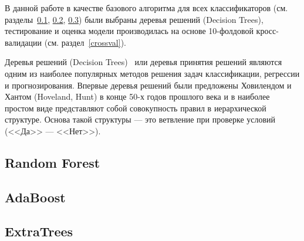 В данной работе в качестве базового алгоритма для всех классификаторов (см. разделы~\ref{random_forest},
\ref{ada}, \ref{extra}) были выбраны деревья решений 
(Decision Trees), тестирование и оценка модели производилась на основе 10-фолдовой кросс-валидации 
(см. раздел~\ref{crossval}).

Деревья решений (Decision Trees)~\cite{data_mining} или деревья принятия решений являются одним из наиболее популярных
методов решения задач классификации, регрессии и прогнозирования. Впервые деревья решений были предложены Ховилендом и Хантом (Hoveland, Hunt) 
в конце 50-х годов прошлого века и в наиболее простом виде представляют собой совокупность правил в иерархической 
структуре. Основа такой структуры --- это ветвление при проверке условий (<<Да>> --- <<Нет>>). 



\subsection{Random Forest}\label{random_forest}

 

\subsection{AdaBoost}\label{ada}


\subsection{ExtraTrees}\label{extra}
